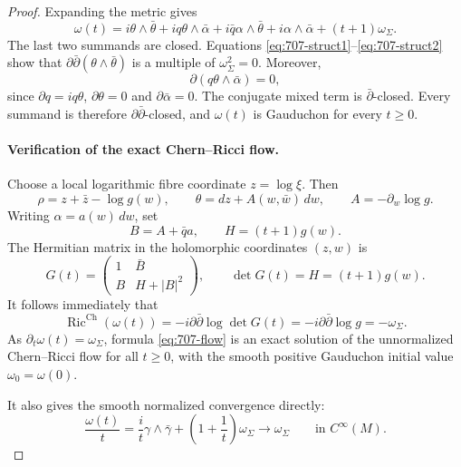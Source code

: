 \documentclass[11pt,a4paper]{article}
\theoremstyle{remark}
\begin{document}
\begin{proof}
Expanding the metric gives
\[
\omega(t)=i\theta\wedge\bar\theta
+i q\theta\wedge\bar\alpha
+i\bar q\alpha\wedge\bar\theta
+i\alpha\wedge\bar\alpha
+(t+1)\omega_\Sigma.
\]
The last two summands are closed. Equations \eqref{eq:707-struct1}--\eqref{eq:707-struct2} show that $\partial\bar\partial(\theta\wedge\bar\theta)$ is a multiple of $\omega_\Sigma^2=0$. Moreover,
\[
\partial(q\theta\wedge\bar\alpha)=0,
\]
since $\partial q=iq\theta$, $\partial\theta=0$ and $\partial\bar\alpha=0$. The conjugate mixed term is $\bar\partial$-closed. Every summand is therefore $\partial\bar\partial$-closed, and $\omega(t)$ is Gauduchon for every $t\ge0$.

\paragraph{Verification of the exact Chern--Ricci flow.}
Choose a local logarithmic fibre coordinate $z=\log\xi$. Then
\[
\rho=z+\bar z-\log g(w),
\qquad
\theta=dz+A(w,\bar w)\,dw,
\qquad A=-\partial_w\log g.
\]
Writing $\alpha=a(w)\,dw$, set
\[
B=A+\bar q a,
\qquad H=(t+1)g(w).
\]
The Hermitian matrix in the holomorphic coordinates $(z,w)$ is
\[
G(t)=
\begin{pmatrix}
1&\bar B\\
B&H+|B|^2
\end{pmatrix},
\qquad \det G(t)=H=(t+1)g(w).
\tag{707.2}\label{eq:707-matrix}
\]
It follows immediately that
\[
\operatorname{Ric}^{\mathrm{Ch}}(\omega(t))
=-i\partial\bar\partial\log\det G(t)
=-i\partial\bar\partial\log g
=-\omega_\Sigma.
\]
As $\partial_t\omega(t)=\omega_\Sigma$, formula \eqref{eq:707-flow} is an exact solution of the unnormalized Chern--Ricci flow for all $t\ge0$, with the smooth positive Gauduchon initial value $\omega_0=\omega(0)$.

It also gives the smooth normalized convergence directly:
\[
\frac{\omega(t)}t
=\frac{i}{t}\gamma\wedge\bar\gamma
+\left(1+\frac1t\right)\omega_\Sigma
\longrightarrow\omega_\Sigma\qquad\text{in }C^\infty(M).
\]


\end{proof}
\end{document}
